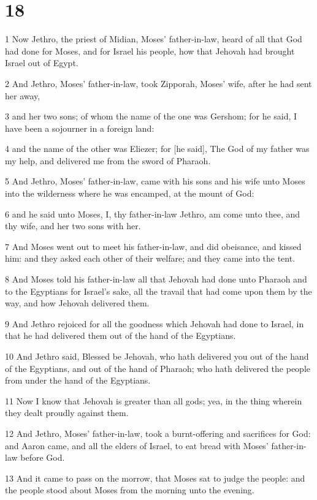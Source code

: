 \chapter{18}

\par 1 Now Jethro, the priest of Midian, Moses' father-in-law, heard of all that God had done for Moses, and for Israel his people, how that Jehovah had brought Israel out of Egypt.
\par 2 And Jethro, Moses' father-in-law, took Zipporah, Moses' wife, after he had sent her away,
\par 3 and her two sons; of whom the name of the one was Gershom; for he said, I have been a sojourner in a foreign land:
\par 4 and the name of the other was Eliezer; for [he said], The God of my father was my help, and delivered me from the sword of Pharaoh.
\par 5 And Jethro, Moses' father-in-law, came with his sons and his wife unto Moses into the wilderness where he was encamped, at the mount of God:
\par 6 and he said unto Moses, I, thy father-in-law Jethro, am come unto thee, and thy wife, and her two sons with her.
\par 7 And Moses went out to meet his father-in-law, and did obeisance, and kissed him: and they asked each other of their welfare; and they came into the tent.
\par 8 And Moses told his father-in-law all that Jehovah had done unto Pharaoh and to the Egyptians for Israel's sake, all the travail that had come upon them by the way, and how Jehovah delivered them.
\par 9 And Jethro rejoiced for all the goodness which Jehovah had done to Israel, in that he had delivered them out of the hand of the Egyptians.
\par 10 And Jethro said, Blessed be Jehovah, who hath delivered you out of the hand of the Egyptians, and out of the hand of Pharaoh; who hath delivered the people from under the hand of the Egyptians.
\par 11 Now I know that Jehovah is greater than all gods; yea, in the thing wherein they dealt proudly against them.
\par 12 And Jethro, Moses' father-in-law, took a burnt-offering and sacrifices for God: and Aaron came, and all the elders of Israel, to eat bread with Moses' father-in-law before God.
\par 13 And it came to pass on the morrow, that Moses sat to judge the people: and the people stood about Moses from the morning unto the evening.
